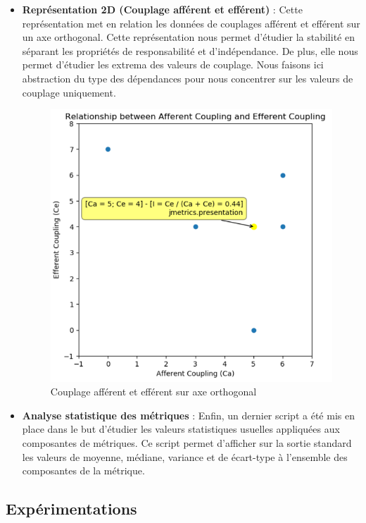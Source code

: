 \documentclass{scrartcl}
\begin{document}
\begin{itemize}
        \item \textbf{Représentation 2D (Couplage afférent et efférent)} : Cette représentation met en relation les données de couplages afférent et efférent sur un axe orthogonal. Cette représentation nous permet d'étudier la stabilité en séparant les propriétés de responsabilité et d'indépendance. De plus, elle nous permet d'étudier les extrema des valeurs de couplage. Nous faisons ici abstraction du type des dépendances pour nous concentrer sur les valeurs de couplage uniquement.
        \begin{figure}[h!]
            \centering
            \includegraphics[scale=0.59]{img/plot/coupling2daxis.png}
            \caption{Couplage afférent et efférent sur axe orthogonal}
        \end{figure}
        
        \item \textbf{Analyse statistique des métriques} : Enfin, un dernier script a été mis en place dans le but d'étudier les valeurs statistiques usuelles appliquées aux composantes de métriques. Ce script permet d'afficher sur la sortie standard les valeurs de moyenne, médiane, variance et de écart-type à l'ensemble des composantes de la métrique.
    \end{itemize}


\newpage
\subsection{Expérimentations}
\end{document}
